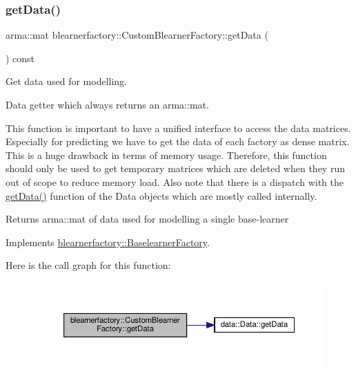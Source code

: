 \subsubsection{\texorpdfstring{get\+Data()}{getData()}}
{\footnotesize\ttfamily arma\+::mat blearnerfactory\+::\+Custom\+Blearner\+Factory\+::get\+Data (\begin{DoxyParamCaption}{ }\end{DoxyParamCaption}) const\hspace{0.3cm}{\ttfamily [virtual]}}



Get data used for modelling. 

Data getter which always returns an arma\+::mat.

This function is important to have a unified interface to access the data matrices. Especially for predicting we have to get the data of each factory as dense matrix. This is a huge drawback in terms of memory usage. Therefore, this function should only be used to get temporary matrices which are deleted when they run out of scope to reduce memory load. Also note that there is a dispatch with the \mbox{\hyperlink{classblearnerfactory_1_1_custom_blearner_factory_a53db4c5d9eb3875241bb47a8d73744e2}{get\+Data()}} function of the Data objects which are mostly called internally.

\begin{DoxyReturn}{Returns}
{\ttfamily arma\+::mat} of data used for modelling a single base-\/learner 
\end{DoxyReturn}


Implements \mbox{\hyperlink{classblearnerfactory_1_1_baselearner_factory_aa3e4580bca870ca3b742dda6c820e1e6}{blearnerfactory\+::\+Baselearner\+Factory}}.

Here is the call graph for this function\+:\nopagebreak
\begin{figure}[H]
\begin{center}
\leavevmode
\includegraphics[width=350pt]{classblearnerfactory_1_1_custom_blearner_factory_a53db4c5d9eb3875241bb47a8d73744e2_cgraph}
\end{center}
\end{figure}
\mbox{\label{classblearnerfactory_1_1_custom_blearner_factory_aac818f8969820d37ec1a391abbb996da}} 
